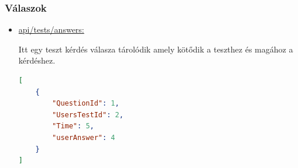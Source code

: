 \subsubsection{Válaszok}
\begin{itemize}[label={$\bullet$}, topsep=0pt, itemsep=0pt, leftmargin=15pt]
    \item[] {\url{api/tests/answers:}}
          \begin{addmargin}[\parindent]{0pt}
              Itt egy teszt kérdés válasza tárolódik amely kötődik a teszthez és magához a kérdéshez.

              \begin{lstlisting}[language=json,firstnumber=1]
[
    {
        "QuestionId": 1,
        "UsersTestId": 2,
        "Time": 5,
        "userAnswer": 4
    }
]
                \end{lstlisting}
          \end{addmargin}
\end{itemize}

